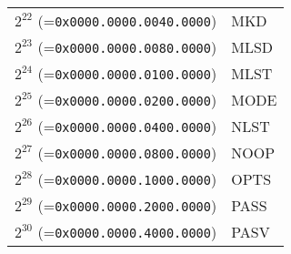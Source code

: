\documentclass[documentation]{subfiles}
\begin{document}
\begin{minipage}{0.49\textwidth}
\begin{longtable}{rl}
        $2^{22}$ (={\tt 0x0000.0000.0040.0000}) & MKD\\
        $2^{23}$ (={\tt 0x0000.0000.0080.0000}) & MLSD\\
        $2^{24}$ (={\tt 0x0000.0000.0100.0000}) & MLST\\
        $2^{25}$ (={\tt 0x0000.0000.0200.0000}) & MODE\\
        $2^{26}$ (={\tt 0x0000.0000.0400.0000}) & NLST\\
        $2^{27}$ (={\tt 0x0000.0000.0800.0000}) & NOOP\\
        $2^{28}$ (={\tt 0x0000.0000.1000.0000}) & OPTS\\
        $2^{29}$ (={\tt 0x0000.0000.2000.0000}) & PASS\\
        $2^{30}$ (={\tt 0x0000.0000.4000.0000}) & PASV\\
        \bottomrule
    \end{longtable}
\end{minipage}
\end{document}
